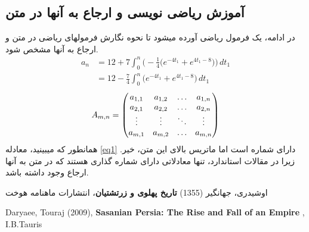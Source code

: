 \documentclass[twoside]{article}
\newcommand{\عنوان}{عنوان ارائه}
\newcommand{\نام}{نام و نام خانوادگی}
\newcommand{\رشته}{رشته}
\newcommand{\دانشگاه}{دانشگاه}
\newcommand{\همکار}{نام و نام خانوادگی همکار}
\begin{document}
\subsection{آموزش ریاضی نویسی و ارجاع به آنها در متن}
\noindent در ادامه، یک فرمول ریاضی آورده میشود تا نحوه نگارش فرمولهای ریاضی در متن و ارجاع به آنها مشخص شود.
  \begin{equation}
  \begin{aligned}
\label{eq1}
a_n &= 12 + 7 \int_0^n\Big(-\frac{1}{4}\big(e^{-4t_1} + e^{4t_1 - 8}\big)\Big) \,dt_1 \\
      &= 12 - \frac{7}{4} \int_0^n\big(e^{-4t_1} + e^{4t_1 - 8}\big) \,dt_1
  \end{aligned}
  \end{equation}
  \begin{equation*}
A_{m,n} = \begin{pmatrix}  a_{1,1} & a_{1,2} & \ldots & a_{1,n} \\ a_{2,1} & a_{2,2} & \ldots & a_{2,n} \\  {\normalsize \vdots} &  {\normalsize \vdots} & {\normalsize \ddots} &  {\normalsize \vdots} \\ a_{m,1} & a_{m,2} & \ldots & a_{m,n} \\  \end{pmatrix}
  \end{equation*}
همانطور که میبینید، معادله \ref{eq1} دارای شماره است اما ماتریس بالای این متن، خیر. زیرا در مقالات استاندارد، تنها معادلاتی دارای شماره گذاری هستند که در متن به آنها ارجاع وجود داشته باشد.
\newpage
\begin{thebibliography}{100}
 اوشیدری، جهانگیر (1355) \textbf{تاریخ پهلوی و زرتشتیان}، انتشارات ماهنامه هوخت
\begin{latin}
 Daryaee, Touraj (2009), \textbf{Sasanian Persia: The Rise and Fall of an Empire} , I.B.Tauris

\end{latin} 

\end{thebibliography}
\end{document}

